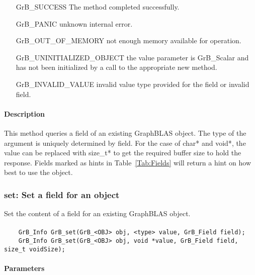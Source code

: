 \begin{itemize}[leftmargin=2.1in]
\item[{\sf GrB\_SUCCESS}]  The method completed successfully.
\item[{\sf GrB\_PANIC}]             unknown internal error.
\item[{\sf GrB\_OUT\_OF\_MEMORY}]          not enough memory available for operation.
\item[{\sf GrB\_UNINITIALIZED\_OBJECT}]          the {\sf value} parameter is {\sf GrB\_Scalar} and has not been
                                    initialized by a call to the appropriate {\sf new} method.
\item[{\sf GrB\_INVALID\_VALUE}]    invalid value type provided for the field or invalid field.
\end{itemize}

\paragraph{Description}

This method queries a field of an existing GraphBLAS object.
The type of the argument is uniquely determined by {\sf field}.
For the case of {\sf char*} and {\sf void*}, the value can be replaced with {\sf size\_t*}
to get the required buffer size to hold the response.
Fields marked as hints in Table~\ref{Tab:Fields} will return a hint on how best to use the
object.

\subsubsection{{\sf set}: Set a field for an object}

Set the content of a field for an existing GraphBLAS object.

\paragraph{\syntax}

\begin{verbatim}
    GrB_Info GrB_set(GrB_<OBJ> obj, <type> value, GrB_Field field);
    GrB_Info GrB_set(GrB_<OBJ> obj, void *value, GrB_Field field, size_t voidSize);
\end{verbatim}

\paragraph{Parameters}

